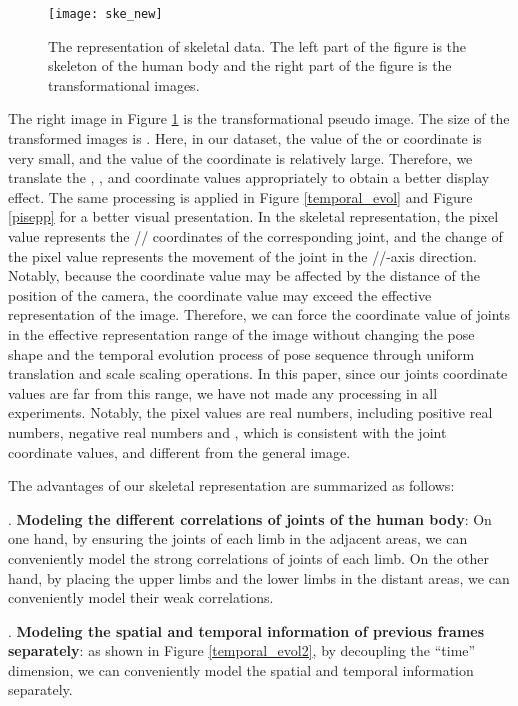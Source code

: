 \documentclass[journal]{IEEEtran}
\begin{document}
\begin{figure}[!t]
\centering
\texttt{[image: ske\_new]}
\caption{The representation of skeletal data. The left part of the figure is the skeleton of the human body and the right part of the figure is the transformational images. }
\label{ske_new}
\end{figure}



The right image in Figure \ref{ske_new} is the transformational pseudo image. The size of the transformed images is . Here, in our dataset, the value of the  or  coordinate is very small, and the value of the  coordinate is relatively large. Therefore, we translate the , , and  coordinate values appropriately to obtain a better display effect. The same processing is applied in Figure \ref{temporal_evol} and Figure \ref{pisepp} for a better visual presentation. In the skeletal representation, the pixel value represents the // coordinates of the corresponding joint, and the change of the pixel value represents the movement of the joint in the //-axis direction. Notably, because the coordinate value may be affected by the distance of the position of the camera, the coordinate value may exceed the effective representation of the image. Therefore, we can force the coordinate value of joints in the effective representation range of the image without changing the pose shape and the temporal evolution process of pose sequence through uniform translation and scale scaling operations. In this paper, since our joints coordinate values are far from this range, we have not made any processing in all experiments. Notably, the pixel values are real numbers, including positive real numbers, negative real numbers and , which is consistent with the joint coordinate values, and different from the general image.

The advantages of our skeletal representation are summarized as follows:

.	{\bf Modeling the different correlations of joints of the human body}: On one hand, by ensuring the joints of each limb in the adjacent areas, we can conveniently model the strong correlations of joints of each limb. On the other hand, by placing the upper limbs and the lower limbs in the distant areas, we can conveniently model their weak correlations.

.	{\bf Modeling the spatial and temporal information of previous frames separately}: as shown in Figure \ref{temporal_evol2}, by decoupling the ``time'' dimension, we can conveniently model the spatial and temporal information separately.
\end{document}
